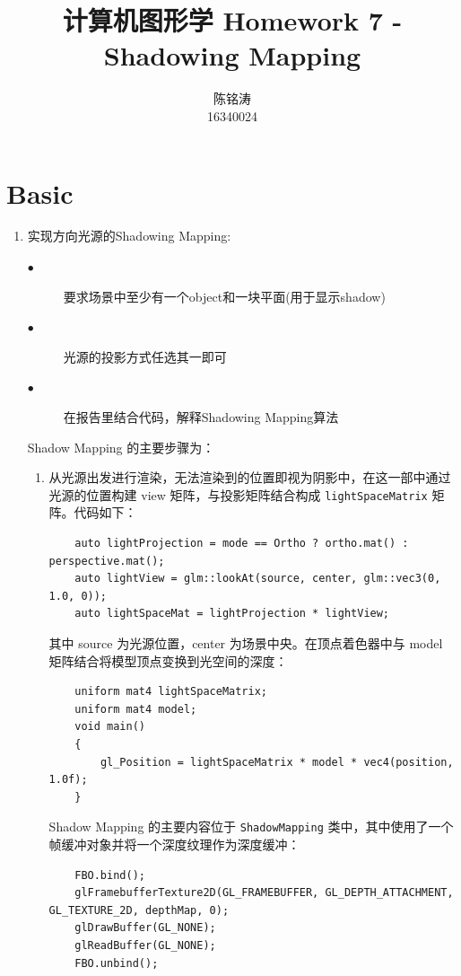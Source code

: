 \documentclass[12pt]{article}
\begin{document}
\author{陈铭涛\\16340024}
\title{计算机图形学 Homework 7 - Shadowing Mapping}
\maketitle

\medskip


\section{Basic}

\begin{enumerate}
    \item 实现方向光源的Shadowing Mapping:
    \begin{description}
        \item[$\bullet$]要求场景中至少有一个object和一块平面(用于显示shadow)
        \item[$\bullet$]光源的投影方式任选其一即可
        \item[$\bullet$]在报告里结合代码，解释Shadowing Mapping算法
    \end{description}

    Shadow Mapping 的主要步骤为：
    \begin{enumerate}
        \item 从光源出发进行渲染，无法渲染到的位置即视为阴影中，在这一部中通过光源的位置构建 view 矩阵，与投影矩阵结合构成 \lstinline{lightSpaceMatrix} 矩阵。代码如下：
        \begin{lstlisting}
    auto lightProjection = mode == Ortho ? ortho.mat() : perspective.mat();
    auto lightView = glm::lookAt(source, center, glm::vec3(0, 1.0, 0));
    auto lightSpaceMat = lightProjection * lightView;
        \end{lstlisting}
        其中 source 为光源位置，center 为场景中央。在顶点着色器中与 model 矩阵结合将模型顶点变换到光空间的深度：
        \begin{lstlisting}
    uniform mat4 lightSpaceMatrix;
    uniform mat4 model;
    void main()
    {
        gl_Position = lightSpaceMatrix * model * vec4(position, 1.0f);
    }
        \end{lstlisting}

        Shadow Mapping 的主要内容位于 \lstinline{ShadowMapping} 类中，其中使用了一个帧缓冲对象并将一个深度纹理作为深度缓冲：
        \begin{lstlisting}
    FBO.bind();
    glFramebufferTexture2D(GL_FRAMEBUFFER, GL_DEPTH_ATTACHMENT, GL_TEXTURE_2D, depthMap, 0);
    glDrawBuffer(GL_NONE);
    glReadBuffer(GL_NONE);
    FBO.unbind();        
        \end{lstlisting}


\end{enumerate}
\end{enumerate}
\end{document}
